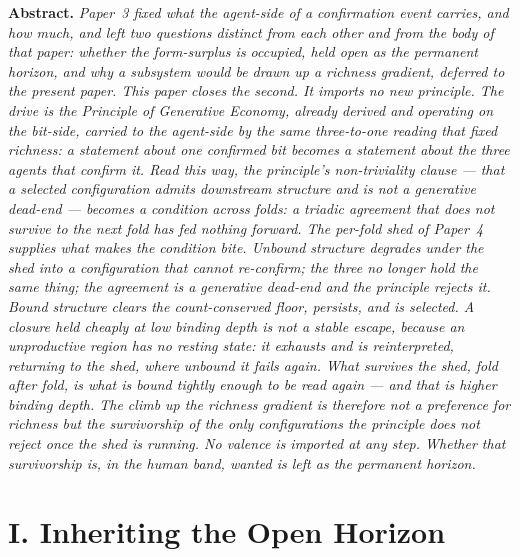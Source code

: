 \documentclass[11pt,oneside]{report}
\theoremstyle{definition}
\theoremstyle{remark}
\newenvironment{paperabstract}
  {\begin{center}\begin{minipage}{0.88\textwidth}\small
   \noindent\textbf{Abstract.}\itshape\space}
  {\end{minipage}\end{center}\vspace{0.4em}}
\begin{document}
\begin{paperabstract}
Paper~3 fixed what the agent-side of a confirmation event carries, and how much,
and left two questions distinct from each other and from the body of that paper:
whether the form-surplus is occupied, held open as the permanent horizon, and why a
subsystem would be drawn up a richness gradient, deferred to the present paper.
This paper closes the second. It imports no new principle. The drive is the
Principle of Generative Economy, already derived and operating on the bit-side,
carried to the agent-side by the same three-to-one reading that fixed richness: a
statement about one confirmed bit becomes a statement about the three agents that
confirm it. Read this way, the principle's non-triviality clause --- that a selected
configuration admits downstream structure and is not a generative dead-end --- becomes
a condition across folds: a triadic agreement that does not survive to the next fold
has fed nothing forward. The per-fold shed of Paper~4 supplies what makes the
condition bite. Unbound structure degrades under the shed into a configuration that
cannot re-confirm; the three no longer hold the same thing; the agreement is a
generative dead-end and the principle rejects it. Bound structure clears the
count-conserved floor, persists, and is selected. A closure held cheaply at low
binding depth is not a stable escape, because an unproductive region has no resting
state: it exhausts and is reinterpreted, returning to the shed, where unbound it
fails again. What survives the shed, fold after fold, is what is bound tightly
enough to be read again --- and that is higher binding depth. The climb up the
richness gradient is therefore not a preference for richness but the survivorship of
the only configurations the principle does not reject once the shed is running. No
valence is imported at any step. Whether that survivorship is, in the human band,
\emph{wanted} is left as the permanent horizon.
\end{paperabstract}

\section*{I. Inheriting the Open Horizon}
\end{document}
